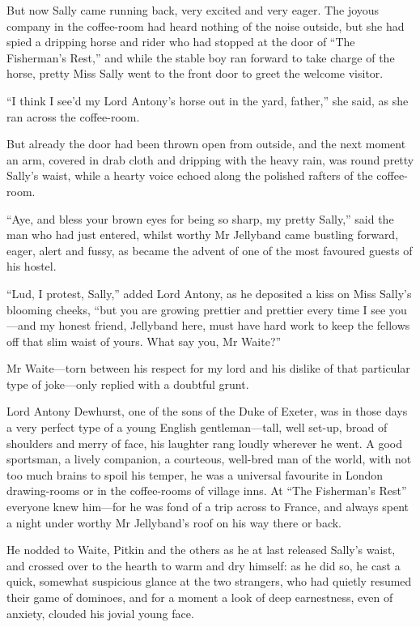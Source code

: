 But now Sally came running back, very excited and very eager. The joyous company in the coffee-room had heard nothing of the noise outside, but she had spied a dripping horse and rider who had stopped at the door of \enquote{The Fisherman's Rest,} and while the stable boy ran forward to take charge of the horse, pretty Miss Sally went to the front door to greet the welcome visitor.

\enquote{I think I see'd my Lord Antony's horse out in the yard, father,} she said, as she ran across the coffee-room.

But already the door had been thrown open from outside, and the next moment an arm, covered in drab cloth and dripping with the heavy rain, was round pretty Sally's waist, while a hearty voice echoed along the polished rafters of the coffee-room.

\enquote{Aye, and bless your brown eyes for being so sharp, my pretty Sally,} said the man who had just entered, whilst worthy Mr Jellyband came bustling forward, eager, alert and fussy, as became the advent of one of the most favoured guests of his hostel.

\enquote{Lud, I protest, Sally,} added Lord Antony, as he deposited a kiss on Miss Sally's blooming cheeks, \enquote{but you are growing prettier and prettier every time I see you---and my honest friend, Jellyband here, must have hard work to keep the fellows off that slim waist of yours. What say you, Mr Waite?}

Mr Waite---torn between his respect for my lord and his dislike of that particular type of joke---only replied with a doubtful grunt.

Lord Antony Dewhurst, one of the sons of the Duke of Exeter, was in those days a very perfect type of a young English gentleman---tall, well set-up, broad of shoulders and merry of face, his laughter rang loudly wherever he went. A good sportsman, a lively companion, a courteous, well-bred man of the world, with not too much brains to spoil his temper, he was a universal favourite in London drawing-rooms or in the coffee-rooms of village inns. At \enquote{The Fisherman's Rest} everyone knew him---for he was fond of a trip across to France, and always spent a night under worthy Mr Jellyband's roof on his way there or back.

He nodded to Waite, Pitkin and the others as he at last released Sally's waist, and crossed over to the hearth to warm and dry himself: as he did so, he cast a quick, somewhat suspicious glance at the two strangers, who had quietly resumed their game of dominoes, and for a moment a look of deep earnestness, even of anxiety, clouded his jovial young face.

